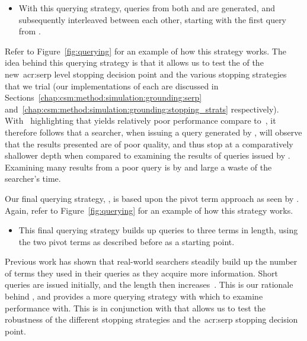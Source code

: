 \begin{itemize}
    \item{ With this querying strategy, queries from both  and  are generated, and subsequently interleaved between each other, starting with the first query from .}
\end{itemize}

Refer to Figure~\ref{fig:querying} for an example of how this strategy works. The idea behind this querying strategy is that it allows us to test the  of the new~\gls{acr:serp} level stopping decision point and the various stopping strategies that we trial (our implementations of each are discussed in Sections~\ref{chap:csm:method:simulation:grounding:serp} and~\ref{chap:csm:method:simulation:grounding:stopping_strats} respectively). With~\cite{keskustalo2009querying} highlighting that  yields relatively poor performance compare to~, it therefore follows that a searcher, when issuing a query generated by , will observe that the results presented are of poor quality, and thus stop at a comparatively shallower depth when compared to examining the results of queries issued by . Examining many results from a poor query is by and large a waste of the searcher's time.

Our final querying strategy, , is based upon the pivot term approach as seen by . Again, refer to Figure~\ref{fig:querying} for an example of how this strategy works.

\begin{itemize}
    \item{ This final querying strategy builds up queries to three terms in length, using the two pivot terms as described before as a starting point.}
\end{itemize}

Previous work has shown that real-world searchers steadily build up the number of terms they used in their queries as they acquire more information. Short queries are issued initially, and the length then increases~\citep{keskustalo2009querying}. This is our rationale behind , and provides a more  querying strategy with which to examine performance with. This is in conjunction with  that allows us to test the robustness of the different stopping strategies and the~\gls{acr:serp} stopping decision point.

